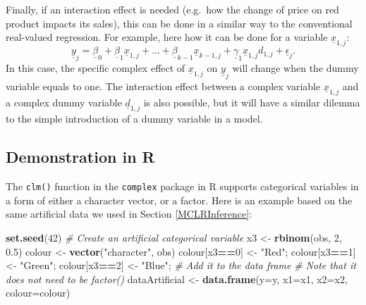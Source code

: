 \documentclass[
]{book}
\newenvironment{Shaded}{\begin{snugshade}}{\end{snugshade}}
\newcommand{\CommentTok}[1]{\textcolor[rgb]{0.56,0.35,0.01}{\textit{#1}}}
\newcommand{\DataTypeTok}[1]{\textcolor[rgb]{0.13,0.29,0.53}{#1}}
\newcommand{\DecValTok}[1]{\textcolor[rgb]{0.00,0.00,0.81}{#1}}
\newcommand{\FloatTok}[1]{\textcolor[rgb]{0.00,0.00,0.81}{#1}}
\newcommand{\KeywordTok}[1]{\textcolor[rgb]{0.13,0.29,0.53}{\textbf{#1}}}
\newcommand{\NormalTok}[1]{#1}
\newcommand{\OperatorTok}[1]{\textcolor[rgb]{0.81,0.36,0.00}{\textbf{#1}}}
\newcommand{\StringTok}[1]{\textcolor[rgb]{0.31,0.60,0.02}{#1}}
\begin{document}
Finally, if an interaction effect is needed (e.g.~how the change of price on red product impacts its sales), this can be done in a similar way to the conventional real-valued regression. For example, here how it can be done for a variable \(\underline{x}_{1,j}\):
\begin{equation}
    \underline{y}_j = \underline{\beta}_0 + \underline{\beta}_1 \underline{x}_{1,j} + \dots + \underline{\beta}_{k-1} \underline{x}_{k-1,j} + \underline{\gamma}_1 \underline{x}_{1,j} d_{1,j} + \underline{\epsilon}_j .
    \label{eq:MultipleCLRComplexDummyInteraction}
\end{equation}
In this case, the specific complex effect of \(\underline{x}_{1,j}\) on \(\underline{y}_j\) will change when the dummy variable equals to one. The interaction effect between a complex variable \(\underline{x}_{1,j}\) and a complex dummy variable \(\underline{d}_{1,j}\) is also possible, but it will have a similar dilemma to the simple introduction of a dummy variable in a model.

\hypertarget{demonstration-in-r-2}{%
\subsection{Demonstration in R}\label{demonstration-in-r-2}}

The \texttt{clm()} function in the \texttt{complex} package in R supports categorical variables in a form of either a character vector, or a factor. Here is an example based on the same artificial data we used in Section \ref{MCLRInference}:

\begin{Shaded}
\begin{Highlighting}[]
\KeywordTok{set.seed}\NormalTok{(}\DecValTok{42}\NormalTok{)}
\CommentTok{\# Create an artificial categorical variable}
\NormalTok{x3 \textless{}{-}}\StringTok{ }\KeywordTok{rbinom}\NormalTok{(obs, }\DecValTok{2}\NormalTok{, }\FloatTok{0.5}\NormalTok{)}
\NormalTok{colour \textless{}{-}}\StringTok{ }\KeywordTok{vector}\NormalTok{(}\StringTok{"character"}\NormalTok{, obs)}
\NormalTok{colour[x3}\OperatorTok{==}\DecValTok{0}\NormalTok{] \textless{}{-}}\StringTok{ "Red"}\NormalTok{;}
\NormalTok{colour[x3}\OperatorTok{==}\DecValTok{1}\NormalTok{] \textless{}{-}}\StringTok{ "Green"}\NormalTok{;}
\NormalTok{colour[x3}\OperatorTok{==}\DecValTok{2}\NormalTok{] \textless{}{-}}\StringTok{ "Blue"}\NormalTok{;}
\CommentTok{\# Add it to the data frame}
\CommentTok{\# Note that it does not need to be factor()}
\NormalTok{dataArtificial \textless{}{-}}\StringTok{ }\KeywordTok{data.frame}\NormalTok{(}\DataTypeTok{y=}\NormalTok{y, }\DataTypeTok{x1=}\NormalTok{x1, }\DataTypeTok{x2=}\NormalTok{x2, }\DataTypeTok{colour=}\NormalTok{colour)}
\end{Highlighting}
\end{Shaded}
\end{document}
